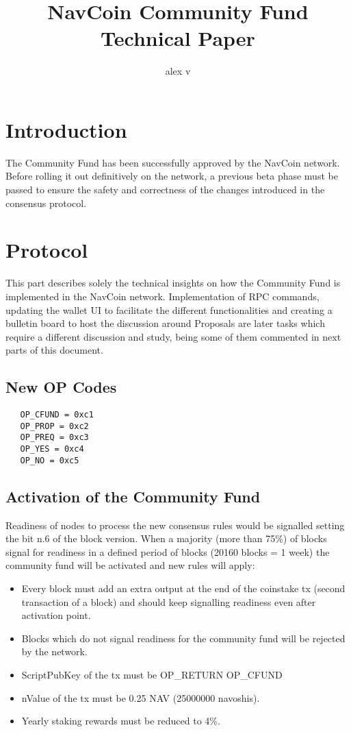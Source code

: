 \documentclass{artikel1}
\begin{document}
\title{NavCoin Community Fund Technical Paper }
\author{alex v}

\maketitle
\begin{flushleft}
	

\section{Introduction}
The Community Fund has been successfully approved by the NavCoin network. Before rolling it out definitively on the network, a previous beta phase must be passed to ensure the safety and correctness of the  changes introduced in the consensus protocol.

\section{Protocol}

This part describes solely the technical insights on how the Community Fund is implemented in the NavCoin network. Implementation of RPC commands, updating the wallet UI to facilitate the different functionalities and creating a bulletin board to host the discussion around Proposals are later tasks which require a different discussion and study, being some of them commented in next parts of this document.

\subsection{New OP Codes}
\begin{lstlisting}
   OP_CFUND = 0xc1
   OP_PROP = 0xc2
   OP_PREQ = 0xc3
   OP_YES = 0xc4
   OP_NO = 0xc5
\end{lstlisting}

\subsection{Activation of the Community Fund}

Readiness of nodes to process the new consensus rules would be signalled setting the bit n.6 of the block version. When a majority (more than 75\%) of blocks signal for readiness in a defined period of blocks (20160 blocks = 1 week) the community fund will be activated and new rules will apply:
\begin{itemize}
\item Every block must add an extra output at the end of the coinstake tx (second transaction of a block) and should keep signalling readiness even after activation point.
\item Blocks which do not signal readiness for the community fund will be rejected by the network.
\item ScriptPubKey of the tx must be OP\_RETURN OP\_CFUND
\item nValue of the tx must be 0.25 NAV (25000000 navoshis).
\item Yearly staking rewards must be reduced to 4\%.
\end{itemize}


\end{flushleft}
\end{document}
